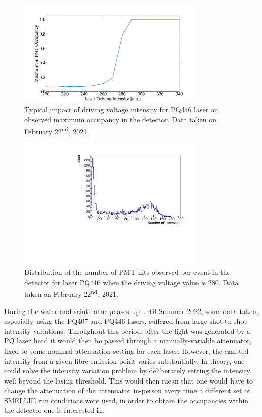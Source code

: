 \begin{figure}
    \centering
    \includegraphics[width=0.8\textwidth]{3_SMELLIEHardware/images/smellie_intensity_scan_pq446_old.pdf}
    \caption[Typical impact of driving voltage intensity for PQ446 laser on observed maximum occupancy in the detector]
    {Typical impact of driving voltage intensity for PQ446 laser on observed maximum occupancy in the detector. Data taken on February 22\textsuperscript{nd}, 2021.}
    \label{fig:pq_old_intensity_dependence}
\end{figure}

\begin{figure}
    \centering
    \includegraphics[width=0.8\textwidth]{3_SMELLIEHardware/images/run_268221_8_nhit_dist.pdf}
    \caption[Distribution of the number of PMT hits observed per event for laser PQ446, before the VFA was added]
    {Distribution of the number of PMT hits observed per event in the detector for laser PQ446 when the driving voltage value is 280. Data taken on February 22\textsuperscript{nd}, 2021.}
    \label{fig:pq_threshold_intensity_variation}
\end{figure}

During the water and scintillator phases up until Summer 2022, some data taken, especially using the PQ407 and PQ446 lasers, suffered from large shot-to-shot intensity variations. Throughout this period, after the light was generated by a PQ laser head it would then be passed through a manually-variable attenuator, fixed to some nominal attenuation setting for each laser. However, the emitted intensity from a given fibre emission point varies substantially. In theory, one could solve the intensity variation problem by deliberately setting the intensity well beyond the lasing threshold. This would then mean that one would have to change the attenuation of the attenuator in-person every time a different set of SMELLIE run conditions were used, in order to obtain the occupancies within the detector one is interested in.

